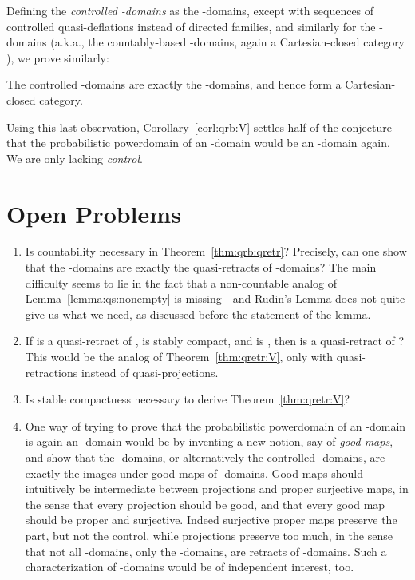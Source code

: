 \documentclass{LMCS}
\begin{document}
Defining the {\em controlled -domains\/} as the
-domains, except with sequences of controlled
quasi-deflations instead of directed families, and similarly for the
-domains (a.k.a., the countably-based -domains, again
a Cartesian-closed category \cite[Theorem~11]{Jung:CCC:LICS}), we
prove similarly:
\begin{thm}
  \label{thm:omega:ctrlQRB}
  The controlled -domains are exactly the
  -domains, and hence form a Cartesian-closed category.
\end{thm}

Using this last observation, Corollary~\ref{corl:qrb:V} settles half
of the conjecture that the probabilistic powerdomain of an
-domain would be an -domain again.  We are only
lacking {\em control\/}.

\section*{Open Problems}

\begin{enumerate}[(1)]
\item Is countability necessary in Theorem~\ref{thm:qrb:qretr}?
  Precisely, can one show that the -domains are exactly the
  quasi-retracts of -domains?  The main difficulty seems to lie in
  the fact that a non-countable analog of
  Lemma~\ref{lemma:qs:nonempty} is missing---and Rudin's Lemma does
  not quite give us what we need, as discussed before the statement
  of the lemma.
\item If  is a quasi-retract of ,  is stably compact, and 
  is , then is  a quasi-retract of
  ?  This would be the analog of
  Theorem~\ref{thm:qretr:V}, only with quasi-retractions instead of
  quasi-projections.
\item Is stable compactness necessary to derive Theorem~\ref{thm:qretr:V}?
\item One way of trying to prove that the probabilistic powerdomain of
  an -domain is again an -domain would be by
  inventing a new notion, say of \emph{good maps}, and show that the
  -domains, or alternatively the controlled
  -domains, are exactly the images under good maps of
  -domains.  Good maps should intuitively be intermediate
  between projections and proper surjective maps, in the sense that
  every projection should be good, and that every good map should be
  proper and surjective.  Indeed surjective proper maps preserve the
   part, but not the control, while projections preserve too
  much, in the sense that not all -domains, only the
  -domains, are retracts of -domains.  Such a
  characterization of -domains would be of independent
  interest, too.
\end{enumerate}
\end{document}
